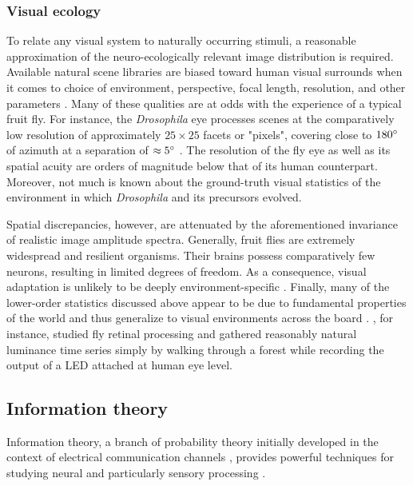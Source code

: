 \subsubsection{Visual ecology}
To relate any visual system to naturally occurring stimuli, a reasonable approximation of the neuro-ecologically relevant image distribution is required. Available natural scene libraries are biased toward human visual surrounds when it comes to choice of environment, perspective, focal length, resolution, and other parameters \citep{Tkacik:2011aa}. Many of these qualities are at odds with the experience of a typical fruit fly. For instance, the \textit{Drosophila} eye processes scenes at the comparatively low resolution of approximately $25 \times 25$ facets or "pixels", covering close to $180\degree$ of azimuth at a separation of $\approx5\degree$ \citep{Borst:2009gv}. The resolution of the fly eye as well as its spatial acuity are orders of magnitude below that of its human counterpart. Moreover, not much is known about the ground-truth visual statistics of the environment in which \textit{Drosophila} and its precursors evolved.

Spatial discrepancies, however, are attenuated by the aforementioned invariance of realistic image amplitude spectra. Generally, fruit flies are extremely widespread and resilient organisms. Their brains possess comparatively few neurons, resulting in limited degrees of freedom. As a consequence, visual adaptation is unlikely to be deeply environment-specific \citep{Dickinson:2014aa}. Finally, many of the lower-order statistics discussed above appear to be due to fundamental properties of the world and thus generalize to visual environments across the board \citep{Geisler:2008gu,Simoncelli:2001dn}. \citet{vanHateren:1997vg}, for instance, studied fly retinal processing and gathered reasonably natural luminance time series simply by walking through a forest while recording the output of a LED attached at human eye level.

\subsection{Information theory}

Information theory, a branch of probability theory initially developed in the context of electrical communication channels \citep{Shannon:1948aa}, provides powerful techniques for studying neural and particularly sensory processing \citep{Borst:1999hw}.

